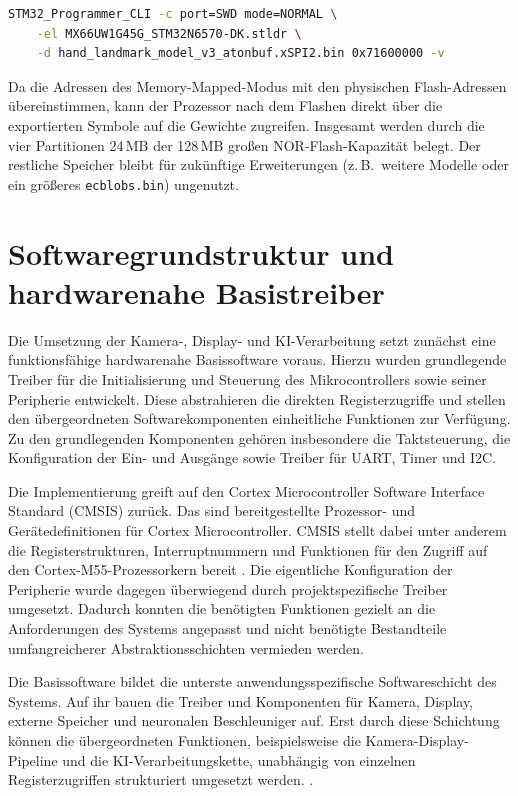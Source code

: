 \begin{lstlisting}[language=bash, caption={Flashen von Modellen mittels STM32Programmer--CLI}, label={lst:flash-cmd}]
STM32_Programmer_CLI -c port=SWD mode=NORMAL \
    -el MX66UW1G45G_STM32N6570-DK.stldr \
    -d hand_landmark_model_v3_atonbuf.xSPI2.bin 0x71600000 -v
\end{lstlisting}

Da die Adressen des Memory-Mapped-Modus mit den physischen Flash-Adressen
übereinstimmen, kann der Prozessor nach dem Flashen direkt über die
exportierten Symbole auf die Gewichte zugreifen. Insgesamt werden durch die
vier Partitionen 24\,MB der 128\,MB großen NOR-Flash-Kapazität belegt. Der
restliche Speicher bleibt für zukünftige Erweiterungen (z.\,B.\ weitere
Modelle oder ein größeres \texttt{ecblobs.bin}) ungenutzt.

\section{Softwaregrundstruktur und hardwarenahe Basistreiber}\label{sec:softwaregrundstruktur}

Die Umsetzung der Kamera-, Display- und KI-Verarbeitung setzt zunächst eine funktionsfähige hardwarenahe Basissoftware voraus. Hierzu wurden grundlegende Treiber für die Initialisierung und Steuerung des Mikrocontrollers sowie seiner Peripherie entwickelt. Diese abstrahieren die direkten Registerzugriffe und stellen den übergeordneten Softwarekomponenten einheitliche Funktionen zur Verfügung. Zu den grundlegenden Komponenten gehören insbesondere die Taktsteuerung, die Konfiguration der Ein- und Ausgänge sowie Treiber für UART, Timer und I2C.

Die Implementierung greift auf den Cortex Microcontroller Software Interface Standard (CMSIS) zurück. Das sind bereitgestellte Prozessor- und Gerätedefinitionen für Cortex Microcontroller. CMSIS stellt dabei unter anderem die Registerstrukturen, Interruptnummern und Funktionen für den Zugriff auf den Cortex-M55-Prozessorkern bereit \cite{CMSISIntroduction}. Die eigentliche Konfiguration der Peripherie wurde dagegen überwiegend durch projektspezifische Treiber umgesetzt. Dadurch konnten die benötigten Funktionen gezielt an die Anforderungen des Systems angepasst und nicht benötigte Bestandteile umfangreicherer Abstraktionsschichten vermieden werden.

Die Basissoftware bildet die unterste anwendungsspezifische Softwareschicht des Systems. Auf ihr bauen die Treiber und Komponenten für Kamera, Display, externe Speicher und neuronalen Beschleuniger auf. Erst durch diese Schichtung können die übergeordneten Funktionen, beispielsweise die Kamera-Display-Pipeline und die KI-Verarbeitungskette, unabhängig von einzelnen Registerzugriffen strukturiert umgesetzt werden. \cite[S. 3-4]{washizakiWasedaUniversityIEEE}.


